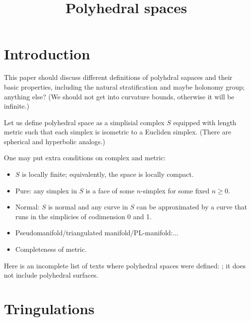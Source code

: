 \documentclass[a4paper,10pt]{article}
\def\thetitle{Polyhedral spaces}
\def\theauthors{}
\begin{document}


\title{\thetitle}
\author{\theauthors}
\date{}
\maketitle

\begin{abstract}

\end{abstract}

\section{Introduction}

This paper should discuss different definitions of polyhdral sapaces and their basic properties, including the natural stratification and maybe holonomy group; anything else?
(We should not get into curvature bounds, otherwise it will be infinite.)

Let us define polyhedral space as a simplisial complex $S$ equipped with length metric such that each simplex is isometric to a Eucliden simplex.
(There are spherical and hyperbolic analogs.)

One may put extra conditions on complex and metric:
\begin{itemize}
\item $S$ is locally finite; equivalently, the space is locally compact.
\item Pure: any simplex in $S$ is a face of some $n$-simplex for some fixed $n\ge 0$.
\item Normal: $S$ is normal and any curve in $S$ can be approximated by a curve that runs in the simplicies of codimension 0 and 1.
\item Pseudomanifold/triangulated manifold/PL-manifold:...
\item Completeness of metric.
\end{itemize}

Here is an incomplete list of texts where polyhedral spaces were defined: \cite{alexander-kapovitch-petrunin2019,alexander-kapovitch-petrunin2024,botero-gil-sombra,burago-burago-ivanov,lebedeva-petrunin,milka1968,milka1969,minemyer2015,bridson-haefliger,panov2009}; it does not include polyhedral surfaces.

\section{Tringulations}
\end{document}
